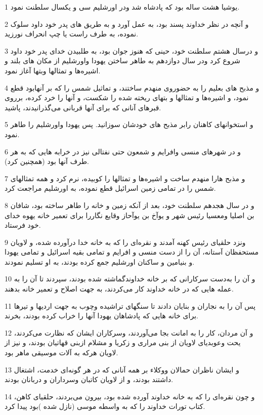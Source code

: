 \par 1 یوشیا هشت ساله بود که پادشاه شد ودر اورشلیم سی و یکسال سلطنت نمود.
\par 2 و آنچه در نظر خداوند پسند بود، به عمل آورد و به طریق های پدر خود داود سلوک نموده، به طرف راست یا چپ انحراف نورزید.
\par 3 و درسال هشتم سلطنت خود، حینی که هنوز جوان بود، به طلبیدن خدای پدر خود داود شروع کرد ودر سال دوازدهم به طاهر ساختن یهودا واورشلیم از مکان های بلند و اشیره‌ها و تمثالها وبتها آغاز نمود.
\par 4 و مذبح های بعلیم را به حضوروی منهدم ساختند، و تماثیل شمس را که بر آنهابود قطع نمود، و اشیره‌ها و تمثالها و بتهای ریخته شده را شکست، و آنها را خرد کرده، برروی قبرهای آنانی که برای آنها قربانی می‌گذرانیدند، پاشید.
\par 5 و استخوانهای کاهنان رابر مذبح های خودشان سوزانید. پس یهودا واورشلیم را طاهر نمود.
\par 6 و در شهرهای منسی وافرایم و شمعون حتی نفتالی نیز در خرابه هایی که به هر طرف آنها بود (همچنین کرد).
\par 7 و مذبح هارا منهدم ساخت و اشیره‌ها و تمثالها را کوبیده، نرم کرد و همه تمثالهای شمس را در تمامی زمین اسرائیل قطع نموده، به اورشلیم مراجعت کرد.
\par 8 و در سال هجدهم سلطنت خود، بعد از آنکه زمین و خانه را طاهر ساخته بود، شافان بن اصلیا ومعسیا رئیس شهر و یوآخ بن یوآحاز وقایع نگاررا برای تعمیر خانه یهوه خدای خود فرستاد.
\par 9 ونزد حلقیای رئیس کهنه آمدند و نقره‌ای را که به خانه خدا درآورده شده، و لاویان مستحفظان آستانه، آن را از دست منسی و افرایم و تمامی بقیه اسرائیل و تمامی یهودا و بنیامین و ساکنان اورشلیم جمع کرده بودند، به او تسلیم نمودند.
\par 10 و آن را به‌دست سرکارانی که بر خانه خداوندگماشته شده بودند، سپردند تا آن را به عمله هایی که در خانه خداوند کار می‌کردند، به جهت اصلاح و تعمیر خانه بدهند.
\par 11 پس آن را به نجاران و بنایان دادند تا سنگهای تراشیده وچوب به جهت اردیها و تیرها برای خانه هایی که پادشاهان یهودا آنها را خراب کرده بودند، بخرند.
\par 12 و آن مردان، کار را به امانت بجا می‌آوردند، وسرکاران ایشان که نظارت می‌کردند، یحت وعوبدیای لاویان از بنی مراری و زکریا و مشلام ازبنی قهاتیان بودند، و نیز از لاویان هر‌که به آلات موسیقی ماهر بود.
\par 13 و ایشان ناظران حمالان ووکلاء بر همه آنانی که در هر گونه‌ای خدمت، اشتغال داشتند بودند، و از لاویان کاتبان وسرداران و دربانان بودند.
\par 14 و چون نقره‌ای را که به خانه خداوند آورده شده بود، بیرون می‌بردند، حلقیای کاهن، کتاب تورات خداوند را که به واسطه موسی (نازل شده )بود پیدا کرد.
